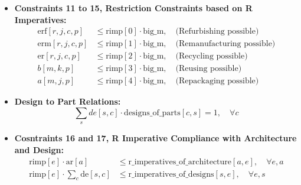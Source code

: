 \documentclass{article}
\begin{document}
\begin{itemize}
        \item \textbf{Constraints 11 to 15, Restriction Constraints based on R Imperatives:}
        \begin{align*}
            \text{erf}[r,j,c,p] &\leq \text{rimp}[0] \cdot \text{big\_m}, \quad \text{(Refurbishing possible)} \\
            \text{erm}[r,j,c,p] &\leq \text{rimp}[1] \cdot \text{big\_m}, \quad \text{(Remanufacturing possible)} \\
            \text{er}[r,j,c,p] &\leq \text{rimp}[2] \cdot \text{big\_m}, \quad \text{(Recycling possible)} \\
            b[m,k,p] &\leq \text{rimp}[3] \cdot \text{big\_m}, \quad \text{(Reusing possible)} \\
            a[m,j,p] &\leq \text{rimp}[4] \cdot \text{big\_m}, \quad \text{(Repackaging possible)}
        \end{align*}

        \item \textbf{Design to Part Relations:}
        \[
            \sum_s de[s,c] \cdot \text{designs\_of\_parts}[c,s] = 1, \quad \forall c
        \]

        \item \textbf{Cosntraints 16 and 17, R Imperative Compliance with Architecture and Design:}
        \begin{align*}
            \text{rimp}[e] \cdot \text{ar}[a] &\leq \text{r\_imperatives\_of\_architecture}[a,e], \quad \forall e, a \\
            \text{rimp}[e] \cdot \sum_c \text{de}[s,c] &\leq \text{r\_imperatives\_of\_designs}[s,e], \quad \forall e, s
        \end{align*}
    \end{itemize}
\end{document}
